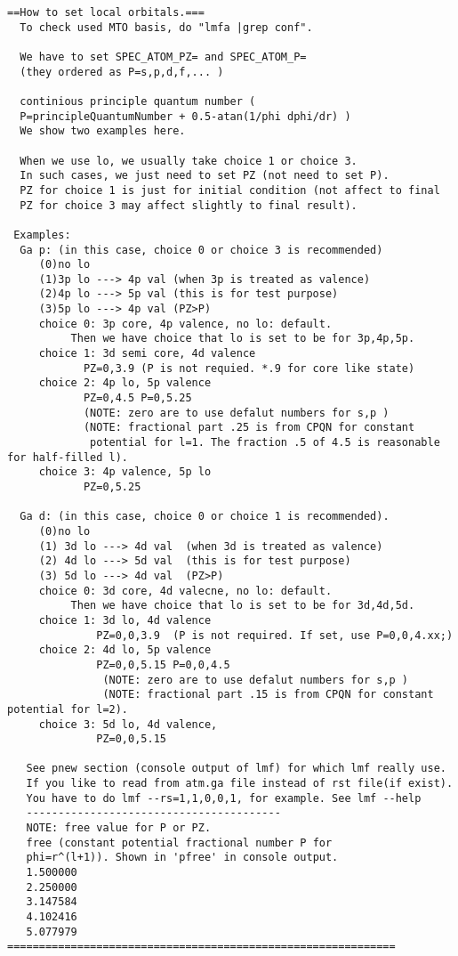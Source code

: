 \documentclass[a4paper,10pt,epsf,fleqn]{article}
\begin{document}
\begin{verbatim}
==How to set local orbitals.===
  To check used MTO basis, do "lmfa |grep conf". 

  We have to set SPEC_ATOM_PZ= and SPEC_ATOM_P=
  (they ordered as P=s,p,d,f,... )
  
  continious principle quantum number ( 
  P=principleQuantumNumber + 0.5-atan(1/phi dphi/dr) )
  We show two examples here.
 
  When we use lo, we usually take choice 1 or choice 3.
  In such cases, we just need to set PZ (not need to set P).
  PZ for choice 1 is just for initial condition (not affect to final
  PZ for choice 3 may affect slightly to final result).

 Examples:
  Ga p: (in this case, choice 0 or choice 3 is recommended)
     (0)no lo
     (1)3p lo ---> 4p val (when 3p is treated as valence)
     (2)4p lo ---> 5p val (this is for test purpose)
     (3)5p lo ---> 4p val (PZ>P)
     choice 0: 3p core, 4p valence, no lo: default.
          Then we have choice that lo is set to be for 3p,4p,5p.
     choice 1: 3d semi core, 4d valence 
            PZ=0,3.9 (P is not requied. *.9 for core like state)
     choice 2: 4p lo, 5p valence 
            PZ=0,4.5 P=0,5.25
            (NOTE: zero are to use defalut numbers for s,p )
            (NOTE: fractional part .25 is from CPQN for constant
             potential for l=1. The fraction .5 of 4.5 is reasonable for half-filled l).
     choice 3: 4p valence, 5p lo 
            PZ=0,5.25

  Ga d: (in this case, choice 0 or choice 1 is recommended).
     (0)no lo
     (1) 3d lo ---> 4d val  (when 3d is treated as valence)
     (2) 4d lo ---> 5d val  (this is for test purpose)
     (3) 5d lo ---> 4d val  (PZ>P)
     choice 0: 3d core, 4d valecne, no lo: default.
          Then we have choice that lo is set to be for 3d,4d,5d.
     choice 1: 3d lo, 4d valence
              PZ=0,0,3.9  (P is not required. If set, use P=0,0,4.xx;)
     choice 2: 4d lo, 5p valence 
              PZ=0,0,5.15 P=0,0,4.5
               (NOTE: zero are to use defalut numbers for s,p )
               (NOTE: fractional part .15 is from CPQN for constant potential for l=2).
     choice 3: 5d lo, 4d valence,  
              PZ=0,0,5.15

   See pnew section (console output of lmf) for which lmf really use.
   If you like to read from atm.ga file instead of rst file(if exist).
   You have to do lmf --rs=1,1,0,0,1, for example. See lmf --help
   ----------------------------------------
   NOTE: free value for P or PZ.
   free (constant potential fractional number P for
   phi=r^(l+1)). Shown in 'pfree' in console output.
   1.500000
   2.250000
   3.147584
   4.102416
   5.077979
=============================================================

\end{verbatim}
\end{document}
